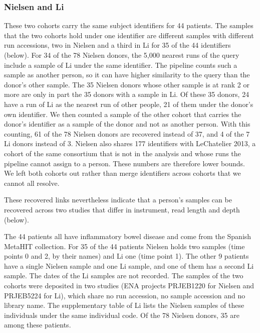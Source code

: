 \documentclass[11pt,a4paper]{article}
\begin{document}
\subsubsection*{Nielsen and Li}

These two cohorts carry the same subject identifiers for 44 patients. The samples that the two cohorts hold under one identifier are different samples with different run accessions, two in Nielsen and a third in Li for 35 of the 44 identifiers (below). For 34 of the 78 Nielsen donors, the 5,000 nearest runs of the query include a sample of Li under the same identifier. The pipeline counts such a sample as another person, so it can have higher similarity to the query than the donor's other sample. The 35 Nielsen donors whose other sample is at rank 2 or more are only in part the 35 donors with a sample in Li. Of these 35 donors, 24 have a run of Li as the nearest run of other people, 21 of them under the donor's own identifier. We then counted a sample of the other cohort that carries the donor's identifier as a sample of the donor and not as another person. With this counting, 61 of the 78 Nielsen donors are recovered instead of 37, and 4 of the 7 Li donors instead of 3. Nielsen also shares 177 identifiers with LeChatelier 2013, a cohort of the same consortium that is not in the analysis and whose runs the pipeline cannot assign to a person. These numbers are therefore lower bounds. We left both cohorts out rather than merge identifiers across cohorts that we cannot all resolve.

These recovered links nevertheless indicate that a person's samples can be recovered across two studies that differ in instrument, read length and depth (below).

The 44 patients all have inflammatory bowel disease and come from the Spanish MetaHIT collection. For 35 of the 44 patients Nielsen holds two samples (time points 0 and 2, by their names) and Li one (time point 1). The other 9 patients have a single Nielsen sample and one Li sample, and one of them has a second Li sample. The dates of the Li samples are not recorded. The samples of the two cohorts were deposited in two studies (ENA projects PRJEB1220 for Nielsen and PRJEB5224 for Li), which share no run accession, no sample accession and no library name. The supplementary table of Li lists the Nielsen samples of these individuals under the same individual code. Of the 78 Nielsen donors, 35 are among these patients.
\end{document}
